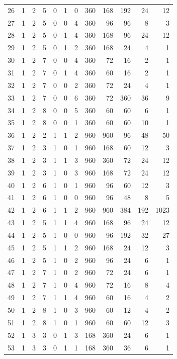\documentclass[11pt,a4paper]{article}
\begin{document}
\begin{longtable}{r|rrr|rrr|rrr|rr}
26 & 1 & 2 & 5 & 0 & 1 & 0 & 360 & 168 & 192 & 24 & 12\\
27 & 1 & 2 & 5 & 0 & 0 & 4 & 360 & 96 & 96 & 8 & 3\\
28 & 1 & 2 & 5 & 0 & 1 & 4 & 360 & 168 & 96 & 24 & 12\\
29 & 1 & 2 & 5 & 0 & 1 & 2 & 360 & 168 & 24 & 4 & 1\\
30 & 1 & 2 & 7 & 0 & 0 & 4 & 360 & 72 & 16 & 2 & 1\\
31 & 1 & 2 & 7 & 0 & 1 & 4 & 360 & 60 & 16 & 2 & 1\\
32 & 1 & 2 & 7 & 0 & 0 & 2 & 360 & 72 & 24 & 4 & 1\\
33 & 1 & 2 & 7 & 0 & 0 & 6 & 360 & 72 & 360 & 36 & 9\\
34 & 1 & 2 & 8 & 0 & 0 & 5 & 360 & 60 & 60 & 6 & 1\\
35 & 1 & 2 & 8 & 0 & 0 & 1 & 360 & 60 & 60 & 10 & 1\\
36 & 1 & 2 & 2 & 1 & 1 & 2 & 960 & 960 & 96 & 48 & 50\\
37 & 1 & 2 & 3 & 1 & 0 & 1 & 960 & 168 & 60 & 12 & 3\\
38 & 1 & 2 & 3 & 1 & 1 & 3 & 960 & 360 & 72 & 24 & 12\\
39 & 1 & 2 & 3 & 1 & 0 & 3 & 960 & 168 & 72 & 24 & 12\\
40 & 1 & 2 & 6 & 1 & 0 & 1 & 960 & 96 & 60 & 12 & 3\\
41 & 1 & 2 & 6 & 1 & 0 & 0 & 960 & 96 & 48 & 8 & 5\\
42 & 1 & 2 & 6 & 1 & 1 & 2 & 960 & 960 & 384 & 192 & 1023\\
43 & 1 & 2 & 5 & 1 & 1 & 4 & 960 & 168 & 96 & 24 & 12\\
44 & 1 & 2 & 5 & 1 & 0 & 0 & 960 & 96 & 192 & 32 & 27\\
45 & 1 & 2 & 5 & 1 & 1 & 2 & 960 & 168 & 24 & 12 & 3\\
46 & 1 & 2 & 5 & 1 & 0 & 2 & 960 & 96 & 24 & 6 & 1\\
47 & 1 & 2 & 7 & 1 & 0 & 2 & 960 & 72 & 24 & 6 & 1\\
48 & 1 & 2 & 7 & 1 & 0 & 4 & 960 & 72 & 16 & 8 & 4\\
49 & 1 & 2 & 7 & 1 & 1 & 4 & 960 & 60 & 16 & 4 & 2\\
50 & 1 & 2 & 8 & 1 & 0 & 3 & 960 & 60 & 12 & 4 & 2\\
51 & 1 & 2 & 8 & 1 & 0 & 1 & 960 & 60 & 60 & 12 & 3\\
52 & 1 & 3 & 3 & 0 & 1 & 3 & 168 & 360 & 24 & 6 & 1\\
53 & 1 & 3 & 3 & 0 & 1 & 1 & 168 & 360 & 36 & 6 & 1\\

\end{longtable}
\end{document}
